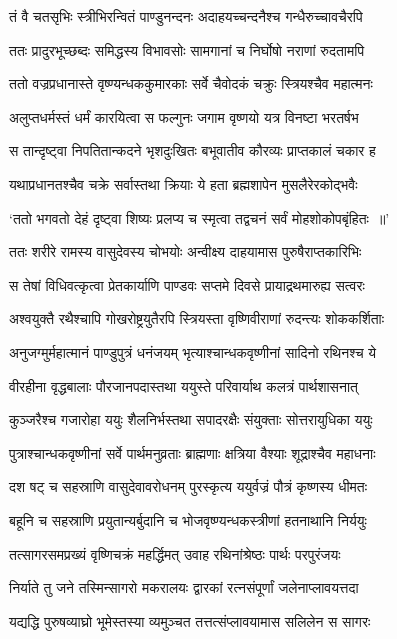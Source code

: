 \twolineshloka
{तं वै चतसृभिः स्त्रीभिरन्वितं पाण्डुनन्दनः}
{अदाहयच्चन्दनैश्च गन्धैरुच्चावचैरपि}


\twolineshloka
{ततः प्रादुरभूच्छब्दः समिद्धस्य विभावसोः}
{सामगानां च निर्घोषो नराणां रुदतामपि}


\threelineshloka
{ततो वज्रप्रधानास्ते वृष्ण्यन्धककुमारकाः}
{सर्वे चैवोदकं चक्रुः स्त्रियश्चैव महात्मनः}
{}


\twolineshloka
{अलुप्तधर्मस्तं धर्मं कारयित्वा स फल्गुनः}
{जगाम वृष्णयो यत्र विनष्टा भरतर्षभ}


\twolineshloka
{स तान्दृष्ट्वा निपतितान्कदने भृशदुःखितः}
{बभूवातीव कौरव्यः प्राप्तकालं चकार ह}


\twolineshloka
{यथाप्रधानतश्चैव चक्रे सर्वास्तथा क्रियाः}
{ये हता ब्रह्मशापेन मुसलैरेरकोद्भवैः}


\twolineshloka
{`ततो भगवतो देहं दृष्ट्वा शिष्यः प्रलप्य च}
{स्मृत्वा तद्वचनं सर्वं मोहशोकोपबृंहितः ॥'}


\twolineshloka
{ततः शरीरे रामस्य वासुदेवस्य चोभयोः}
{अन्वीक्ष्य दाहयामास पुरुषैराप्तकारिभिः}


\twolineshloka
{स तेषां विधिवत्कृत्वा प्रेतकार्याणि पाण्डवः}
{सप्तमे दिवसे प्रायाद्रथमारुह्य सत्वरः}


\twolineshloka
{अश्वयुक्तै रथैश्चापि गोखरोष्ट्रयुतैरपि}
{स्त्रियस्ता वृष्णिवीराणां रुदन्त्यः शोककर्शिताः}


\twolineshloka
{अनुजग्मुर्महात्मानं पाण्डुपुत्रं धनंजयम्}
{भृत्याश्चान्धकवृष्णीनां सादिनो रथिनश्च ये}


\twolineshloka
{वीरहीना वृद्धबालाः पौरजानपदास्तथा}
{ययुस्ते परिवार्याथ कलत्रं पार्थशासनात्}


\twolineshloka
{कुञ्जरैश्च गजारोहा ययुः शैलनिर्भस्तथा}
{सपादरक्षैः संयुक्ताः सोत्तरायुधिका ययुः}


\twolineshloka
{पुत्राश्चान्धकवृष्णीनां सर्वे पार्थमनुव्रताः}
{ब्राह्मणाः क्षत्रिया वैश्याः शूद्राश्चैव महाधनाः}


\twolineshloka
{दश षट् च सहस्राणि वासुदेवावरोधनम्}
{पुरस्कृत्य ययुर्वज्रं पौत्रं कृष्णस्य धीमतः}


\twolineshloka
{बहूनि च सहस्राणि प्रयुतान्यर्बुदानि च}
{भोजवृष्ण्यन्धकस्त्रीणां हतनाथानि निर्ययुः}


\twolineshloka
{तत्सागरसमप्रख्यं वृष्णिचक्रं महर्द्धिमत्}
{उवाह रथिनांश्रेष्ठः पार्थः परपुरंजयः}


\twolineshloka
{निर्याते तु जने तस्मिन्सागरो मकरालयः}
{द्वारकां रत्नसंपूर्णां जलेनाप्लावयत्तदा}


\twolineshloka
{यद्यद्धि पुरुषव्याघ्रो भूमेस्तस्या व्यमुञ्चत}
{तत्तत्संप्लावयामास सलिलेन स सागरः}


